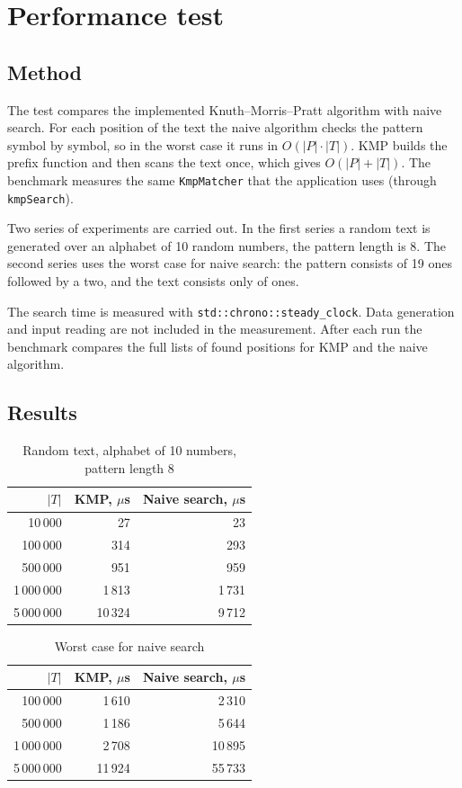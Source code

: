 \section{Performance test}

\subsection{Method}

The test compares the implemented Knuth--Morris--Pratt algorithm with naive search.
For each position of the text the naive algorithm checks the pattern symbol by symbol,
so in the worst case it runs in $O(|P| \cdot |T|)$.
KMP builds the prefix function and then scans the text once, which gives
$O(|P| + |T|)$. The benchmark measures the same \texttt{KmpMatcher} that the application uses
(through \texttt{kmpSearch}).

Two series of experiments are carried out. In the first series a random text is generated over
an alphabet of 10 random numbers, the pattern length is 8. The second series uses the worst case
for naive search: the pattern consists of 19 ones followed by a two,
and the text consists only of ones.

The search time is measured with \texttt{std::chrono::steady\_clock}.
Data generation and input reading are not included in the measurement. After each run the
benchmark compares the full lists of found positions for KMP and the naive algorithm.

\subsection{Results}

\begin{table}[!ht]
\centering
\begin{tabular}{|r|r|r|}
\hline
\rowcolor{lightgray}
$|T|$ & KMP, $\mu$s & Naive search, $\mu$s \\
\hline
10\,000 & 27 & 23 \\
\hline
100\,000 & 314 & 293 \\
\hline
500\,000 & 951 & 959 \\
\hline
1\,000\,000 & 1\,813 & 1\,731 \\
\hline
5\,000\,000 & 10\,324 & 9\,712 \\
\hline
\end{tabular}
\caption{Random text, alphabet of 10 numbers, pattern length 8}
\end{table}

\begin{table}[!ht]
\centering
\begin{tabular}{|r|r|r|}
\hline
\rowcolor{lightgray}
$|T|$ & KMP, $\mu$s & Naive search, $\mu$s \\
\hline
100\,000 & 1\,610 & 2\,310 \\
\hline
500\,000 & 1\,186 & 5\,644 \\
\hline
1\,000\,000 & 2\,708 & 10\,895 \\
\hline
5\,000\,000 & 11\,924 & 55\,733 \\
\hline
\end{tabular}
\caption{Worst case for naive search}
\end{table}

